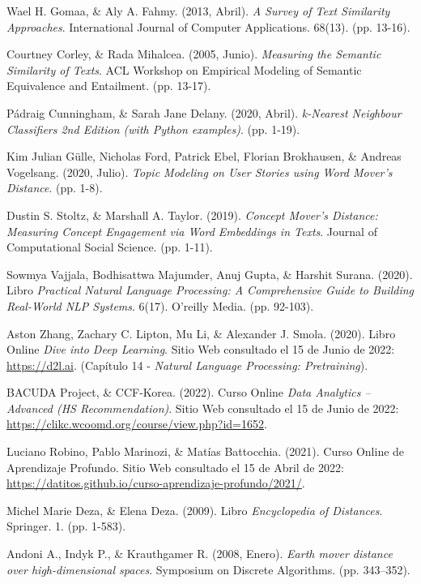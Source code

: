 \documentclass[12pt,a4paper]{article}
\begin{document}
\begin{sloppypar}
\begin{thebibliography}{9}
Wael H. Gomaa, \& Aly A. Fahmy. (2013, Abril). \textit{A Survey of Text Similarity Approaches}. International Journal of Computer Applications. 68(13). (pp. 13-16).

Courtney Corley, \& Rada Mihalcea. (2005, Junio). \textit{Measuring the Semantic Similarity of Texts}. ACL Workshop on Empirical Modeling of Semantic Equivalence and Entailment. (pp. 13-17).

Pádraig Cunningham, \& Sarah Jane Delany. (2020, Abril). \textit{k-Nearest Neighbour Classifiers 2nd Edition (with Python examples)}. (pp. 1-19).

Kim Julian Gülle, Nicholas Ford, Patrick Ebel, Florian Brokhausen,  \& Andreas Vogelsang. (2020, Julio). \textit{Topic Modeling on User Stories using Word Mover’s Distance}. (pp. 1-8).

Dustin S. Stoltz, \& Marshall A. Taylor. (2019). \textit{Concept Mover’s Distance: Measuring Concept Engagement via Word Embeddings in Texts}. Journal of Computational Social Science. (pp. 1-11).

Sowmya Vajjala, Bodhisattwa Majumder, Anuj Gupta, \& Harshit Surana. (2020). Libro \textit{Practical Natural Language Processing: A Comprehensive Guide to Building Real-World NLP Systems}. 6(17). O’reilly Media. (pp. 92-103).

Aston Zhang, Zachary C. Lipton, Mu Li, \& Alexander J. Smola. (2020). Libro Online \textit{Dive into Deep Learning}. Sitio Web consultado el 15 de Junio de 2022: \url{https://d2l.ai}. (Capítulo 14 - \textit{Natural Language Processing: Pretraining}).

BACUDA Project, \& CCF-Korea. (2022). Curso Online \textit{Data Analytics – Advanced (HS Recommendation)}. Sitio Web consultado el 15 de Junio de 2022: \url{https://clikc.wcoomd.org/course/view.php?id=1652}.

Luciano Robino, Pablo Marinozi, \& Matías Battocchia. (2021). Curso Online de Aprendizaje Profundo. Sitio Web consultado el 15 de Abril de 2022: \url{https://datitos.github.io/curso-aprendizaje-profundo/2021/}.

Michel Marie Deza, \& Elena Deza. (2009). Libro \textit{Encyclopedia of Distances}. Springer. 1. (pp. 1-583).

Andoni A., Indyk P., \& Krauthgamer R. (2008, Enero). \textit{Earth mover distance over high-dimensional spaces}. Symposium on Discrete Algorithms. (pp. 343–352).


\end{thebibliography}
\end{sloppypar}
\end{document}
